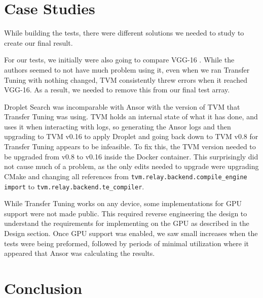 \documentclass[conference]{IEEEtran}
\begin{document}

\section{Case Studies}
While building the tests, there were different solutions we needed to study to create our final result. 

For our tests, we initially were also going to compare VGG-16 \cite{simonyan_very_2015}. While the authors seemed to not have much problem using it, even when we ran Transfer Tuning with nothing changed, TVM consistently threw errors when it reached VGG-16. As a result, we needed to remove this from our final test array.

Droplet Search was incomparable with Ansor with the version of TVM that Transfer Tuning was using. TVM holds an internal state of what it has done, and uses it when interacting with logs, so generating the Ansor logs and then upgrading to TVM v0.16 to apply Droplet and going back down to TVM v0.8 for Transfer Tuning appears to be infeasible. To fix this, the TVM version needed to be upgraded from v0.8 to v0.16 inside the Docker container. This surprisingly did not cause much of a problem, as the only edits needed to upgrade were upgrading CMake and changing all references from \lstinline{tvm.relay.backend.compile_engine import} to \lstinline{tvm.relay.backend.te_compiler}. 

While Transfer Tuning works on any device, some implementations for GPU support were not made public. This required reverse engineering the design to understand the requirements for implementing on the GPU as described in the Design section. Once GPU support was enabled, we saw small increases when the tests were being preformed, followed by periods of minimal utilization where it appeared that Ansor was calculating the results.

\section{Conclusion}

\printbibliography
\end{document}
